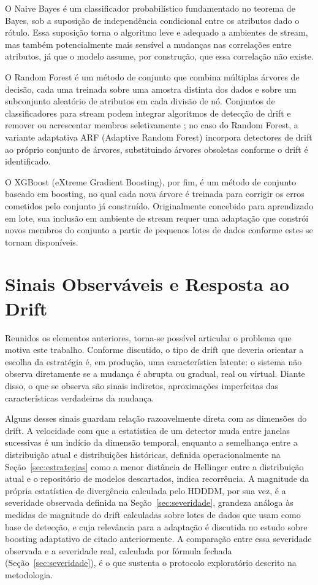 O Naive Bayes é um classificador probabilístico fundamentado no teorema de
Bayes, sob a suposição de independência condicional entre os atributos dado o
rótulo. Essa suposição torna o algoritmo leve e adequado a ambientes de
stream, mas também potencialmente mais sensível a mudanças nas correlações
entre atributos, já que o modelo assume, por construção, que essa correlação
não existe.

O Random Forest é um método de conjunto que combina múltiplas árvores de
decisão, cada uma treinada sobre uma amostra distinta dos dados e sobre um
subconjunto aleatório de atributos em cada divisão de nó. Conjuntos de classificadores para stream podem
integrar algoritmos de detecção de drift e remover ou acrescentar membros
seletivamente \cite{gomes2017}; no caso do Random Forest, a variante
adaptativa ARF (Adaptive Random Forest) \cite{gomes2017arf} incorpora
detectores de drift ao próprio conjunto de árvores, substituindo árvores
obsoletas conforme o drift é identificado.

O XGBoost (eXtreme Gradient Boosting), por fim, é um método de conjunto baseado em boosting, no qual cada
nova árvore é treinada para corrigir os erros cometidos pelo conjunto já
construído. Originalmente concebido para aprendizado em lote, sua inclusão em
ambiente de stream requer uma adaptação que constrói novos membros do conjunto
a partir de pequenos lotes de dados conforme estes se tornam disponíveis.

\section{Sinais Observáveis e Resposta ao Drift}
\label{sec:sinais}
Reunidos os elementos anteriores, torna-se possível articular o problema que
motiva este trabalho. Conforme discutido, o tipo de drift que deveria orientar
a escolha da estratégia é, em produção, uma característica latente: o sistema
não observa diretamente se a mudança é abrupta ou gradual, real ou virtual.
Diante disso, o que se observa são sinais indiretos, aproximações imperfeitas
das características verdadeiras da mudança.

Alguns desses sinais guardam relação razoavelmente direta com as dimensões do
drift. A velocidade com que a estatística de um detector muda entre janelas
sucessivas é um indício da dimensão temporal, enquanto a semelhança entre a
distribuição atual e distribuições históricas, definida operacionalmente na
Seção~\ref{sec:estrategias} como a menor distância de Hellinger entre a
distribuição atual e o repositório de modelos descartados, indica
recorrência. A magnitude
da própria estatística de divergência calculada pelo HDDDM, por sua vez, é a
severidade observada definida na Seção~\ref{sec:severidade}, grandeza análoga às
medidas de magnitude do drift calculadas sobre lotes de dados que
 usam como base de detecção, e cuja relevância
para a adaptação é discutida no estudo sobre boosting adaptativo de
 citado anteriormente. A comparação entre
essa severidade observada e a severidade real, calculada por fórmula fechada
(Seção~\ref{sec:severidade}), é o que sustenta o protocolo exploratório
descrito na metodologia.

